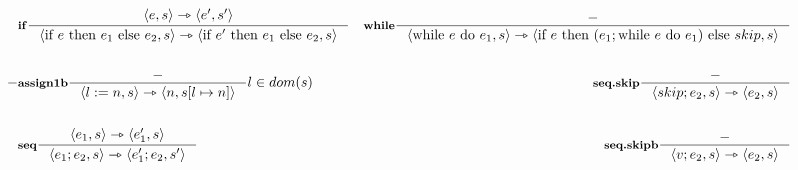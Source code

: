 \documentclass[a4paper, 10pt]{article}
\newcommand{\infer}[4]{\inference[\textbf{#1}]{#2}{#3}#4 }
\newcommand{\srule}[2]{\langle #1 \rangle \rightarrowtriangle \langle #2 \rangle}
\newcommand{\memrep}[3]{#1 \lbrack #2 \mapsto #3 \rbrack}
\begin{document}
\begin{align*}
		&\infer{if}{\srule{e,s}{e',s'}}{\srule{\text{if } e \text{ then } e_1 \text{ else } e_2,s}{\text{if } e' \text{ then } e_1 \text{ else } e_2,s}}{}
		&\infer{while}{-}{\srule{\text{while } e \text{ do } e_1, s}{\text{if } e \text{ then } (e_1; \text{while } e \text{ do } e_1) \text{ else } skip, s}}{} \\ \\-
		&\infer{assign1b}{-}{\srule{l:=n,s}{n, \memrep{s}{l}{n}}}{l \in dom(s)}
		&\infer{seq.skip}{-}{\srule{skip;e_2,s}{e_2,s}}{} \\ \\
		&\infer{seq}{\srule{e_1,s}{e_1',s}}{\srule{e_1;e_2,s}{e_1';e_2,s'}}{}
		&\infer{seq.skipb}{-}{\srule{v;e_2,s}{e_2,s}}{}
	\end{align*}
\end{document}
